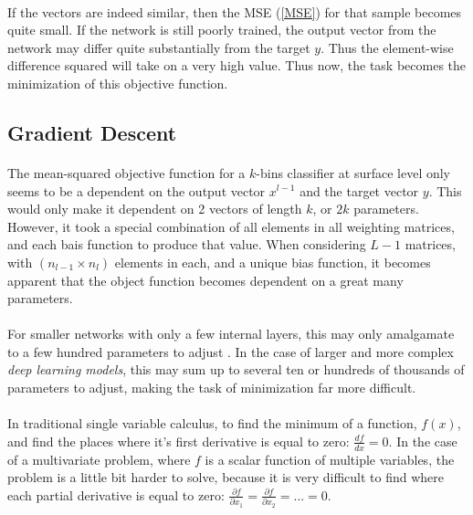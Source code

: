 \documentclass[12pt,letterpaper]{article}
\begin{document}
\paragraph*{}If the vectors are indeed similar, then the MSE (\ref{MSE}) for that sample becomes quite small. If the network is still poorly trained, the output vector from the network may differ quite substantially from the target $y$. Thus the element-wise difference squared will take on a very high value. Thus now, the task becomes the minimization of this objective function.


\subsection{Gradient Descent}
\paragraph*{}The mean-squared objective function for a $k$-bins classifier at surface level only seems to be a dependent on the output vector $x^{l-1}$ and the target vector $y$. This would only make it dependent on 2 vectors of length $k$, or $2k$ parameters. However, it took a special combination of all elements in all weighting matrices, and each bais function to produce that value. When considering $L-1$ matrices, with $(n_{l-1} \times n_l)$ elements in each, and a unique bias function, it becomes apparent that the object function becomes dependent on a great many parameters.
\paragraph*{}For smaller networks with only a few internal layers, this may only amalgamate to a few hundred parameters to adjust \cite{Goodfellow}. In the case of larger and more complex \textit{deep learning models}, this may sum up to several ten or hundreds of thousands of parameters to adjust, making the task of minimization far more difficult. 
\paragraph*{}In traditional single variable calculus, to find the minimum of a function, $f(x)$, and find the places where it's first derivative is equal to zero: $\frac{df}{dx} = 0$. In the case of a multivariate problem, where $f$ is a scalar function of multiple variables, the problem is a little bit harder to solve, because it is very difficult to find where each partial derivative is equal to zero: $\frac{\partial f}{\partial x_1} = \frac{\partial f}{\partial x_2} = ... = 0$.
\end{document}
